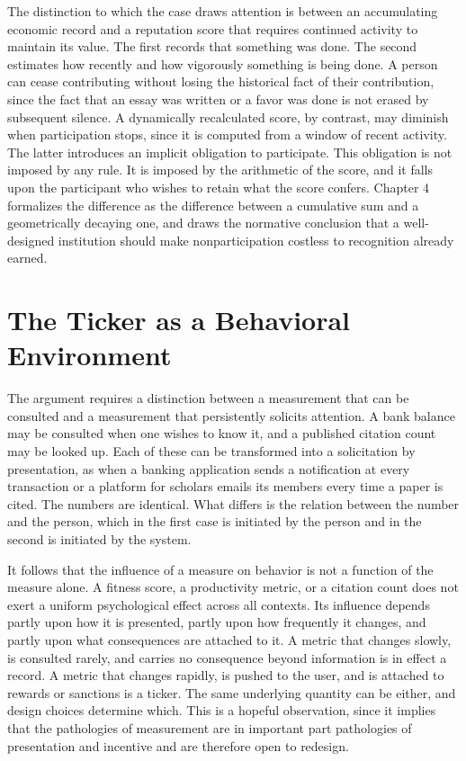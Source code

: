 \documentclass[11pt]{report}
\theoremstyle{definition}
\theoremstyle{remark}
\begin{document}
The distinction to which the case draws attention is between an accumulating economic record and a reputation score that requires continued activity to maintain its value. The first records that something was done. The second estimates how recently and how vigorously something is being done. A person can cease contributing without losing the historical fact of their contribution, since the fact that an essay was written or a favor was done is not erased by subsequent silence. A dynamically recalculated score, by contrast, may diminish when participation stops, since it is computed from a window of recent activity. The latter introduces an implicit obligation to participate. This obligation is not imposed by any rule. It is imposed by the arithmetic of the score, and it falls upon the participant who wishes to retain what the score confers. Chapter 4 formalizes the difference as the difference between a cumulative sum and a geometrically decaying one, and draws the normative conclusion that a well-designed institution should make nonparticipation costless to recognition already earned.

\section{The Ticker as a Behavioral Environment}

The argument requires a distinction between a measurement that can be consulted and a measurement that persistently solicits attention. A bank balance may be consulted when one wishes to know it, and a published citation count may be looked up. Each of these can be transformed into a solicitation by presentation, as when a banking application sends a notification at every transaction or a platform for scholars emails its members every time a paper is cited. The numbers are identical. What differs is the relation between the number and the person, which in the first case is initiated by the person and in the second is initiated by the system.

It follows that the influence of a measure on behavior is not a function of the measure alone. A fitness score, a productivity metric, or a citation count does not exert a uniform psychological effect across all contexts. Its influence depends partly upon how it is presented, partly upon how frequently it changes, and partly upon what consequences are attached to it. A metric that changes slowly, is consulted rarely, and carries no consequence beyond information is in effect a record. A metric that changes rapidly, is pushed to the user, and is attached to rewards or sanctions is a ticker. The same underlying quantity can be either, and design choices determine which. This is a hopeful observation, since it implies that the pathologies of measurement are in important part pathologies of presentation and incentive and are therefore open to redesign.
\end{document}
